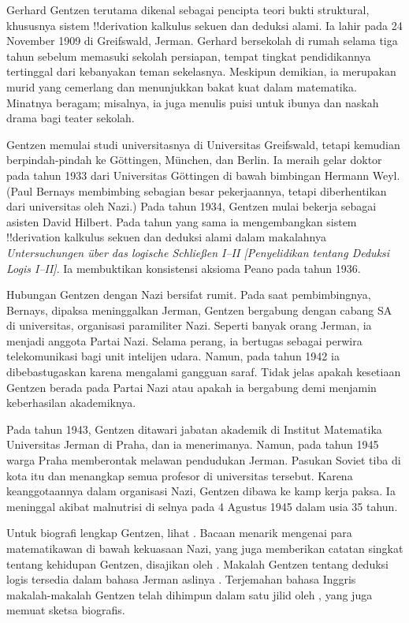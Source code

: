 \documentclass[../../../include/open-logic-section]{subfiles}
\begin{document}



Gerhard Gentzen terutama dikenal sebagai pencipta teori bukti struktural,
khususnya sistem !!{derivation} kalkulus sekuen dan deduksi alami. Ia lahir
pada 24 November 1909 di Greifswald, Jerman. Gerhard bersekolah di rumah
selama tiga tahun sebelum memasuki sekolah persiapan, tempat tingkat
pendidikannya tertinggal dari kebanyakan teman sekelasnya. Meskipun demikian,
ia merupakan murid yang cemerlang dan menunjukkan bakat kuat dalam
matematika. Minatnya beragam; misalnya, ia juga menulis puisi untuk ibunya
dan naskah drama bagi teater sekolah.

Gentzen memulai studi universitasnya di Universitas Greifswald, tetapi
kemudian berpindah-pindah ke G\"{o}ttingen, München, dan Berlin. Ia meraih
gelar doktor pada tahun 1933 dari Universitas G\"{o}ttingen di bawah
bimbingan Hermann Weyl. (Paul Bernays membimbing sebagian besar pekerjaannya,
tetapi diberhentikan dari universitas oleh Nazi.) Pada tahun 1934, Gentzen
mulai bekerja sebagai asisten David Hilbert. Pada tahun yang sama ia
mengembangkan sistem !!{derivation} kalkulus sekuen dan deduksi alami dalam
makalahnya \emph{Untersuchungen \"{u}ber das logische Schlie\ss en I--II
  [Penyelidikan tentang Deduksi Logis I--II]}. Ia membuktikan konsistensi
aksioma Peano pada tahun 1936.

Hubungan Gentzen dengan Nazi bersifat rumit. Pada saat pembimbingnya, Bernays,
dipaksa meninggalkan Jerman, Gentzen bergabung dengan cabang SA di
universitas, organisasi paramiliter Nazi. Seperti banyak orang Jerman, ia
menjadi anggota Partai Nazi. Selama perang, ia bertugas sebagai perwira
telekomunikasi bagi unit intelijen udara. Namun, pada tahun 1942 ia
dibebastugaskan karena mengalami gangguan saraf. Tidak jelas apakah kesetiaan
Gentzen berada pada Partai Nazi atau apakah ia bergabung demi menjamin
keberhasilan akademiknya.

Pada tahun 1943, Gentzen ditawari jabatan akademik di Institut Matematika
Universitas Jerman di Praha, dan ia menerimanya. Namun, pada tahun 1945 warga
Praha memberontak melawan pendudukan Jerman. Pasukan Soviet tiba di kota itu
dan menangkap semua profesor di universitas tersebut. Karena keanggotaannya
dalam organisasi Nazi, Gentzen dibawa ke kamp kerja paksa. Ia meninggal
akibat malnutrisi di selnya pada 4 Agustus 1945 dalam usia 35 tahun.

\begin{reading}
Untuk biografi lengkap Gentzen, lihat \citet{Menzler-Trott2007}. Bacaan
menarik mengenai para matematikawan di bawah kekuasaan Nazi, yang juga
memberikan catatan singkat tentang kehidupan Gentzen, disajikan oleh
\citet{Segal2014}. Makalah Gentzen tentang deduksi logis tersedia dalam
bahasa Jerman aslinya \citep{Gentzen1935a,Gentzen1935b}. Terjemahan bahasa
Inggris makalah-makalah Gentzen telah dihimpun dalam satu jilid oleh
\citet{Gentzen1969}, yang juga memuat sketsa biografis.
\end{reading}
\end{document}
